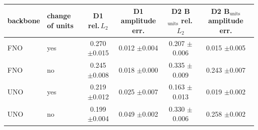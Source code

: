 \begin{tabular}{llcccc}
\toprule
backbone & change of units & D1 rel.\,$L_2$ & D1 amplitude err. & D2 B$_{\mathrm{units}}$ rel.\,$L_2$ & D2 B$_{\mathrm{units}}$ amplitude err. \\
\midrule
FNO & yes & 0.270 {\scriptsize$\pm$0.015} & 0.012 {\scriptsize$\pm$0.004} & 0.207 {\scriptsize$\pm$0.006} & 0.015 {\scriptsize$\pm$0.005} \\
FNO & no & 0.245 {\scriptsize$\pm$0.008} & 0.018 {\scriptsize$\pm$0.000} & 0.335 {\scriptsize$\pm$0.009} & 0.243 {\scriptsize$\pm$0.007} \\
UNO & yes & 0.219 {\scriptsize$\pm$0.012} & 0.025 {\scriptsize$\pm$0.007} & 0.163 {\scriptsize$\pm$0.013} & 0.019 {\scriptsize$\pm$0.002} \\
UNO & no & 0.199 {\scriptsize$\pm$0.004} & 0.049 {\scriptsize$\pm$0.002} & 0.330 {\scriptsize$\pm$0.006} & 0.258 {\scriptsize$\pm$0.002} \\
\bottomrule
\end{tabular}